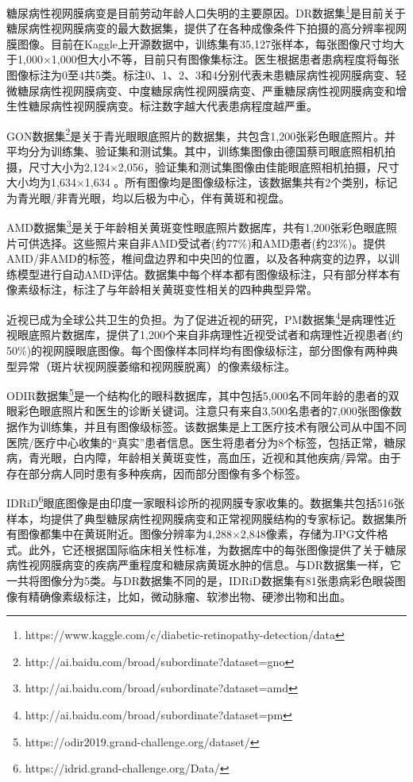 糖尿病性视网膜病变是目前劳动年龄人口失明的主要原因。DR数据集\footnote{https://www.kaggle.com/c/diabetic-retinopathy-detection/data}是目前关于糖尿病性视网膜病变的最大数据集，提供了在各种成像条件下拍摄的高分辨率视网膜图像。目前在Kaggle上开源数据中，训练集有35,127张样本，每张图像尺寸均大于1,000$\times$1,000但大小不等，目前只有图像集标注。医生根据患者患病程度将每张图像标注为0至4共5类。标注0、1、2、3和4分别代表未患糖尿病性视网膜病变、轻微糖尿病性视网膜病变、中度糖尿病性视网膜病变、严重糖尿病性视网膜病变和增生性糖尿病性视网膜病变。标注数字越大代表患病程度越严重。

GON数据集\footnote{http://ai.baidu.com/broad/subordinate?dataset=gno}是关于青光眼眼底照片的数据集，共包含1,200张彩色眼底照片。并平均分为训练集、验证集和测试集。其中，训练集图像由德国蔡司眼底照相机拍摄，尺寸大小为2,124$\times$2,056，验证集和测试集图像由佳能眼底照相机拍摄，尺寸大小均为1,634$\times$1,634 。所有图像均是图像级标注，该数据集共有2个类别，标记为青光眼/非青光眼，均以后极为中心，伴有黄斑和视盘。

AMD数据集\footnote{http://ai.baidu.com/broad/subordinate?dataset=amd}是关于年龄相关黄斑变性眼底照片数据库，共有1,200张彩色眼底照片可供选择。这些照片来自非AMD受试者(约77\%)和AMD患者(约23\%)。提供AMD/非AMD的标签，椎间盘边界和中央凹的位置，以及各种病变的边界，以训练模型进行自动AMD评估。数据集中每个样本都有图像级标注，只有部分样本有像素级标注，标注了与年龄相关黄斑变性相关的四种典型异常。

近视已成为全球公共卫生的负担。为了促进近视的研究，PM数据集\footnote{http://ai.baidu.com/broad/subordinate?dataset=pm}是病理性近视眼底照片数据库，提供了1,200个来自非病理性近视受试者和病理性近视患者(约50\%)的视网膜眼底图像。每个图像样本同样均有图像级标注，部分图像有两种典型异常（斑片状视网膜萎缩和视网膜脱离）的像素级标注。

ODIR数据集\footnote{https://odir2019.grand-challenge.org/dataset/}是一个结构化的眼科数据库，其中包括5,000名不同年龄的患者的双眼彩色眼底照片和医生的诊断关键词。注意只有来自3,500名患者的7,000张图像数据作为训练集，并且有图像级标签。该数据集是上工医疗技术有限公司从中国不同医院/医疗中心收集的“真实”患者信息。医生将患者分为8个标签，包括正常，糖尿病，青光眼，白内障，年龄相关黄斑变性，高血压，近视和其他疾病/异常。由于存在部分病人同时患有多种疾病，因而部分图像有多个标签。

IDRiD\footnote{https://idrid.grand-challenge.org/Data/}眼底图像是由印度一家眼科诊所的视网膜专家收集的。数据集共包括516张样本，均提供了典型糖尿病性视网膜病变和正常视网膜结构的专家标记。数据集所有图像都集中在黄斑附近。图像分辨率为4,288$\times$2,848像素，存储为JPG文件格式。此外，它还根据国际临床相关性标准，为数据库中的每张图像提供了关于糖尿病性视网膜病变的疾病严重程度和糖尿病黄斑水肿的信息。与DR数据集一样，它一共将图像分为5类。与DR数据集不同的是，IDRiD数据集有81张患病彩色眼袋图像有精确像素级标注，比如，微动脉瘤、软渗出物、硬渗出物和出血。

